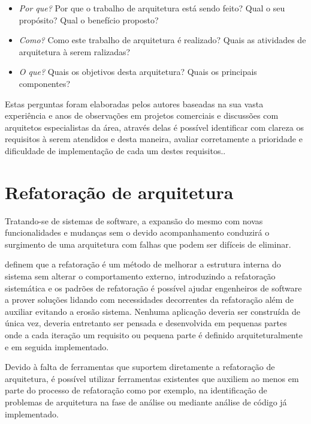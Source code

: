 \begin{itemize}
    \item \textit{Por que?} Por que o trabalho de arquitetura está sendo feito? Qual o seu propósito? Qual o benefício proposto?
    \item \textit{Como?} Como este trabalho de arquitetura é realizado? Quais as atividades de arquitetura à serem ralizadas?
    \item \textit{O que?} Quais os objetivos desta arquitetura? Quais os principais componentes?
\end{itemize}

Estas perguntas foram elaboradas pelos autores baseadas na sua vasta experiência e anos de observações em projetos comerciais e discussões com arquitetos especialistas da área, através delas é possível identificar com clareza os requisitos à serem atendidos e desta maneira, avaliar corretamente a prioridade e dificuldade de implementação de cada um destes requisitos..


\section{Refatoração de arquitetura}

Tratando-se de sistemas de software, a expansão do mesmo com novas funcionalidades e mudanças sem o devido acompanhamento conduzirá o surgimento de uma arquitetura com falhas que podem ser difíceis de eliminar. 

\cite{babar2013agile} definem que a refatoração é um método de melhorar a estrutura interna do sistema sem alterar o comportamento externo, introduzindo a refatoração sistemática e os padrões de refatoração é possível ajudar engenheiros de software a prover soluções lidando com necessidades decorrentes da refatoração além de auxiliar evitando a erosão sistema.
Nenhuma aplicação deveria ser construída de única vez,  deveria entretanto ser pensada e desenvolvida em pequenas partes onde a cada iteração um requisito ou pequena parte é definido arquiteturalmente e em seguida implementado.

Devido à falta de ferramentas que suportem diretamente a refatoração de arquitetura, é possível utilizar ferramentas existentes que auxiliem ao menos em parte do processo de refatoração como por exemplo, na identificação de problemas de arquitetura na fase de análise ou mediante análise de código já implementado.

